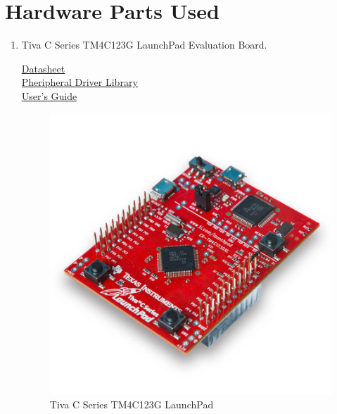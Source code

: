 \documentclass[a4paper,12pt,oneside]{book}
\begin{document}
\section{Hardware Parts Used}
\begin{enumerate}
 \item  Tiva C Series TM4C123G LaunchPad Evaluation Board.

 \href{http://www.ti.com.cn/cn/lit/ds/symlink/tm4c123gh6pm.pdf}{ Datasheet}\\
  \href{http://www.ti.com/lit/ug/spmu298a/spmu298a.pdff}{ Pheripheral Driver Library}\\
  \href{http://www.mouser.com/ds/2/405/spmu296-242111.pdf}{User's Guide}
  \begin{figure}[h]
        \centering
        \includegraphics[scale=0.2]{tiva}
        \caption{Tiva C Series TM4C123G LaunchPad}
      \end{figure}



\end{enumerate}
\end{document}
